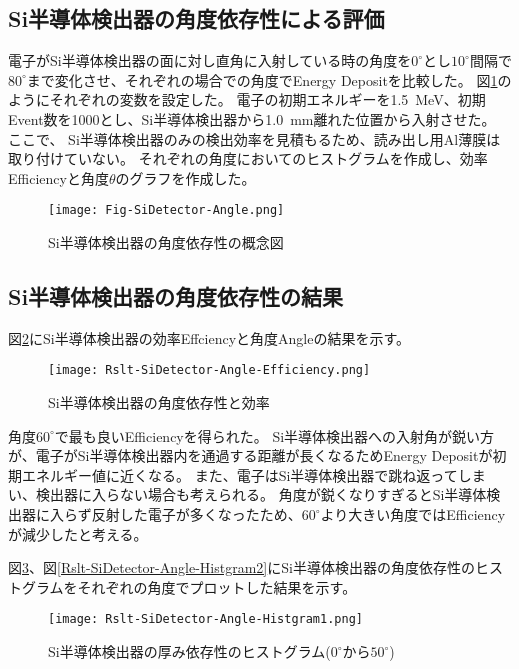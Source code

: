\documentclass[a4paper,10pt]{jreport}
\begin{document}
\subsection{Si半導体検出器の角度依存性による評価}

電子がSi半導体検出器の面に対し直角に入射している時の角度を$0^{\circ}$とし$10^{\circ}$間隔で$80^{\circ}$まで変化させ、それぞれの場合での角度でEnergy Depositを比較した。
 図\ref{Fig-SiDetector-Angle}のようにそれぞれの変数を設定した。
電子の初期エネルギーを\SI{1.5}{MeV}、初期Event数を1000とし、Si半導体検出器から\SI{1.0}{mm}離れた位置から入射させた。
ここで、 Si半導体検出器のみの検出効率を見積もるため、読み出し用Al薄膜は取り付けていない。
それぞれの角度においてのヒストグラムを作成し、効率Efficiencyと角度$\theta$のグラフを作成した。

\begin{figure}[H]
	\center
	\texttt{[image: Fig-SiDetector-Angle.png]}
	\caption{Si半導体検出器の角度依存性の概念図} \label{Fig-SiDetector-Angle}
\end{figure}



\subsection{Si半導体検出器の角度依存性の結果}

図\ref{Rslt-SiDetector-Angle-Efficiency}にSi半導体検出器の効率Effciencyと角度Angleの結果を示す。
	
\begin{figure}[H]
	\center
	\texttt{[image: Rslt-SiDetector-Angle-Efficiency.png]}
	\caption{Si半導体検出器の角度依存性と効率} \label{Rslt-SiDetector-Angle-Efficiency}
\end{figure}

角度$60^{\circ}$で最も良いEfficiencyを得られた。
Si半導体検出器への入射角が鋭い方が、電子がSi半導体検出器内を通過する距離が長くなるためEnergy Depositが初期エネルギー値に近くなる。
また、電子はSi半導体検出器で跳ね返ってしまい、検出器に入らない場合も考えられる。
角度が鋭くなりすぎるとSi半導体検出器に入らず反射した電子が多くなったため、$60^{\circ}$より大きい角度ではEfficiencyが減少したと考える。

図\ref{Rslt-SiDetector-Angle-Histgram1}、図\ref{Rslt-SiDetector-Angle-Histgram2}にSi半導体検出器の角度依存性のヒストグラムをそれぞれの角度でプロットした結果を示す。

\begin{figure}[H]
	\center
	\texttt{[image: Rslt-SiDetector-Angle-Histgram1.png]}
	\caption{Si半導体検出器の厚み依存性のヒストグラム($0^{\circ}$から$50^{\circ}$)} \label{Rslt-SiDetector-Angle-Histgram1}
\end{figure}
\end{document}
